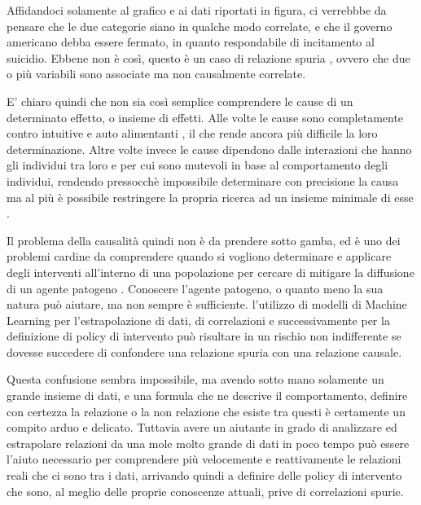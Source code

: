 Affidandoci solamente al grafico e ai dati riportati in figura, 
ci verrebbbe da pensare che le due categorie siano in qualche
modo correlate, e che il governo americano debba essere fermato, 
in quanto respondabile di incitamento al suicidio.
Ebbene non è così, questo è un caso di relazione spuria \cite{wiki:Spurious_relationship},
ovvero che due o più variabili sono associate ma non causalmente correlate.

E' chiaro quindi che non sia così semplice comprendere le cause 
di un determinato effetto, o insieme di effetti. Alle volte
le cause sono completamente contro intuitive e auto alimentanti \cite{wiki:Positive_feedback}, 
il che rende ancora più difficile la loro determinazione.
Altre volte invece le cause dipendono dalle interazioni che hanno 
gli individui tra loro e per cui sono mutevoli in base al 
comportamento degli individui, rendendo pressocchè impossibile
determinare con precisione la causa ma al più è possibile
restringere la propria ricerca ad un insieme minimale di esse \cite{Galea2009-lj}. 

Il problema della causalità quindi non è da prendere sotto 
gamba, ed è uno dei problemi cardine da comprendere quando 
si vogliono determinare e applicare degli interventi all'interno 
di una popolazione per cercare di mitigare la diffusione di
un agente patogeno \cite{Parascandola2001-kw}. Conoscere
l'agente patogeno, o quanto meno la sua natura può aiutare,
ma non sempre è sufficiente. l'utilizzo di modelli di 
Machine Learning per l'estrapolazione di dati, di correlazioni
e successivamente per la definizione di policy di intervento
può risultare in un rischio non indifferente se dovesse succedere
di confondere una relazione spuria con una relazione causale.

Questa confusione sembra impossibile, ma avendo sotto mano
solamente un grande insieme di dati, e una formula che ne descrive
il comportamento, definire con certezza la relazione 
o la non relazione che esiste tra questi è certamente un 
compito arduo e delicato. Tuttavia avere un aiutante in grado 
di analizzare ed estrapolare relazioni da una mole molto 
grande di dati in poco tempo può essere l'aiuto necessario 
per comprendere più velocemente e reattivamente le 
relazioni reali che ci sono tra i dati, arrivando quindi 
a definire delle policy di intervento che sono, al meglio 
delle proprie conoscenze attuali, prive di correlazioni spurie.

